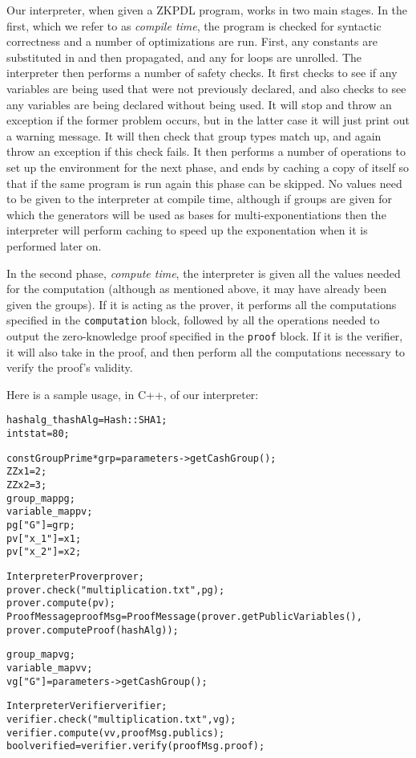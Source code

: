 \documentclass[letterpaper,11pt]{article}
\begin{document}
Our interpreter, when given a ZKPDL program, works in two main stages.  In the
first, which we refer to as \emph{compile time}, the program is checked for 
syntactic correctness and a number of
optimizations are run.  First, any constants are substituted in and then
propagated, and any for loops are unrolled.  The interpreter then performs a
number of safety checks.  It first checks to see if any variables are being
used that were not previously declared, and also checks to see any variables
are being declared without being used.  It will stop and throw an exception 
if the former problem occurs, but in the latter case it will just
print out a warning message.  It will then check that group types match up,
and again throw an exception if this check fails.  It then performs a
number of operations to set up the environment for the next phase, and ends by 
caching a copy of itself so that if the
same program is run again this phase can be skipped.  No values need to be
given to the interpreter at compile time, although if groups are given for
which the generators will be used as bases for
multi-exponentiations then the interpreter will perform caching to
speed up the exponentation when it is performed later on.

In the second phase, \emph{compute time}, the interpreter is given all the
values needed for the computation (although as mentioned above, it may have
already been given the groups).  If it is acting as the prover, it performs 
all the computations
specified in the \verb#computation# block, followed by all the operations
needed to output the zero-knowledge proof specified in the \verb#proof# block.
If it is the verifier, it will also take in the proof, and then perform all
the computations necessary to verify the proof's validity.

Here is a sample usage, in C++, of our interpreter:

\begin{alltt}
\footnotesize{

hashalg_t hashAlg = Hash::SHA1;
int stat = 80;

const GroupPrime* grp = parameters->getCashGroup();
ZZ x1 = 2;
ZZ x2 = 3;
group_map pg;
variable_map pv;
pg["G"] = grp;
pv["x_1"] = x1;
pv["x_2"] = x2;

InterpreterProver prover;
prover.check("multiplication.txt", pg);
prover.compute(pv);
ProofMessage proofMsg = ProofMessage(prover.getPublicVariables(),
					 		 		 prover.computeProof(hashAlg));

group_map vg;
variable_map vv;
vg["G"] = parameters->getCashGroup();

InterpreterVerifier verifier;
verifier.check("multiplication.txt", vg);
verifier.compute(vv, proofMsg.publics);
bool verified = verifier.verify(proofMsg.proof);
}
\end{alltt}
\end{document}
